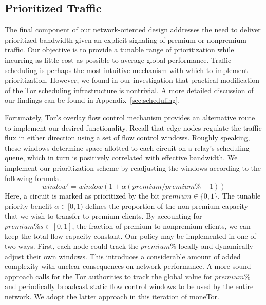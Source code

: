 \subsection{Prioritized Traffic}
\label{subsub:prioritized}

The final component of our network-oriented design addresses the need to deliver
prioritized bandwidth given an explicit signaling of premium or nonpremium
traffic. Our objective is to provide a tunable range of prioritization while
incurring as little cost as possible to average global performance. Traffic
scheduling is perhaps the most intuitive mechanism with which to implement
prioritization. However, we found in our investigation that practical
modification of the Tor scheduling infrastructure is nontrivial. A more detailed
discussion of our findings can be found in Appendix~\ref{sec:scheduling}.

Fortunately, Tor's overlay flow control mechanism provides an alternative route
to implement our desired functionality. Recall that edge nodes regulate the
traffic flux in either direction using a set of flow control windows. Roughly
speaking, these windows determine space allotted to each circuit on a relay's
scheduling queue, which in turn is positively correlated with effective
bandwidth. We implement our prioritization scheme by readjusting the windows
according to the following formula.
\begin{equation}
  window' = window(1+ \alpha(premium / premium\% - 1))
  \label{eq:flow}
\end{equation}
Here, a circuit is marked as prioritized by the bit
$premium \in \{0, 1\}$. The tunable priority benefit
$\alpha \in [0, 1)$ defines the proportion of the non-premium capacity that we wish
to transfer to premium clients. By accounting for
$premium\%s \in [0,1]$, the fraction of premium to nonpremium clients, we
can keep the total flow capacity constant. Our policy may be
implemented in one of two ways. First, each node could track the
$premium\%$ locally and dynamically adjust their own windows. This
introduces a considerable amount of added complexity with unclear
consequences on network performance. A more sound approach calls for
the Tor authorities to track the global value for $premium\%$ and
periodically broadcast static flow control windows to be used by the
entire network. We adopt the latter approach in this iteration of
moneTor.

